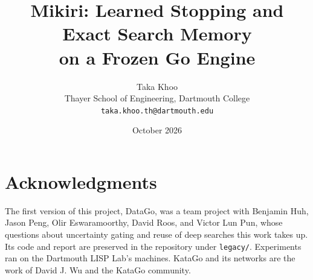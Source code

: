 \documentclass[11pt]{article}
\title{Mikiri: Learned Stopping and Exact Search Memory\\ on a Frozen Go Engine}
\author{Taka Khoo\\[2pt]
Thayer School of Engineering, Dartmouth College\\
\texttt{taka.khoo.th@dartmouth.edu}}
\date{October 2026}
\begin{document}
\maketitle












\section*{Acknowledgments}
The first version of this project, DataGo, was a team project with Benjamin Huh, Jason Peng, Olir Eswaramoorthy, David Roos, and Victor Lun Pun, whose questions about uncertainty gating and reuse of deep searches this work takes up. Its code and report are preserved in the repository under \texttt{legacy/}. Experiments ran on the Dartmouth LISP Lab's machines. KataGo and its networks are the work of David J. Wu and the KataGo community.





\end{document}
